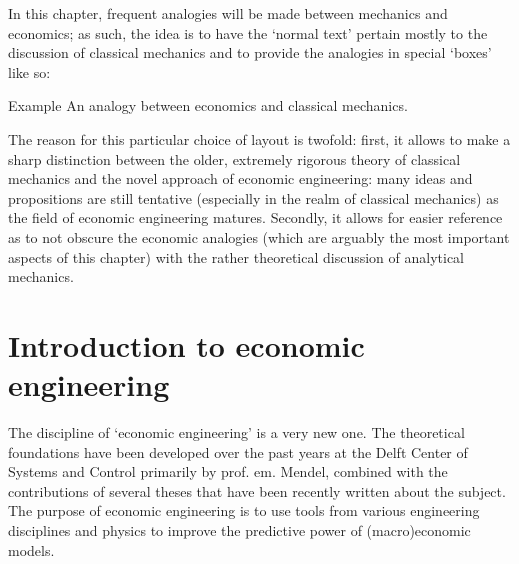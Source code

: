 In this chapter, frequent analogies will be made between mechanics and economics; as such, the idea is to have the `normal text' pertain mostly to the discussion of classical mechanics and to provide the analogies in special `boxes' like so:
\begin{econ}{Example}
    An analogy between economics and classical mechanics.
\end{econ}
The reason for this particular choice of layout is twofold: first, it allows to make a sharp distinction between the older, extremely rigorous theory of classical mechanics and the novel approach of economic engineering: many ideas and propositions are still tentative (especially in the realm of classical mechanics) as the field of economic engineering matures. Secondly, it allows for easier reference as to not obscure the economic analogies (which are arguably the most important aspects of this chapter) with the rather theoretical discussion of analytical mechanics.

\section{Introduction to economic engineering}
\label{sec:ee_intro}
The discipline of `economic engineering' is a very new one. The theoretical foundations have been developed over the past years at the Delft Center of Systems and Control primarily by prof. em. Mendel, combined with the contributions of several theses that have been recently written about the subject. The purpose of economic engineering is to use tools from various engineering disciplines and physics to improve the predictive power of (macro)economic models.

